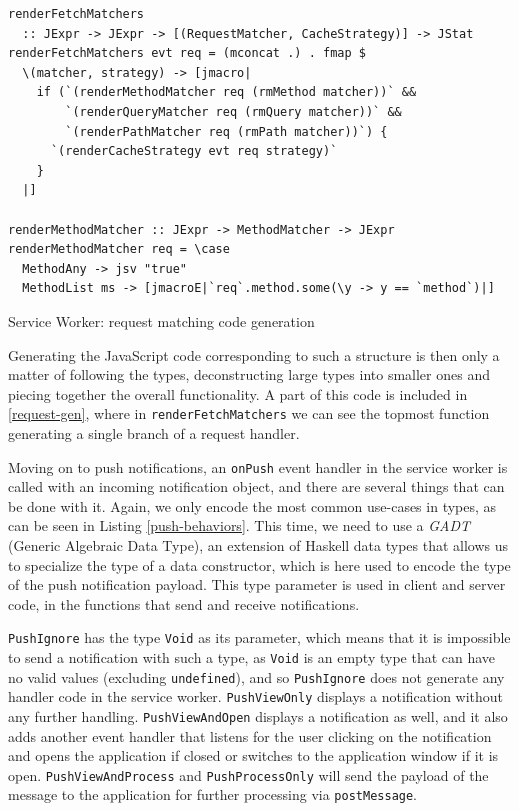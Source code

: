 \documentclass[english,zadani,odsaz]{fitthesis}
\begin{document}
\begin{listing}[tb]
\begin{verbatim}
renderFetchMatchers
  :: JExpr -> JExpr -> [(RequestMatcher, CacheStrategy)] -> JStat
renderFetchMatchers evt req = (mconcat .) . fmap $
  \(matcher, strategy) -> [jmacro|
    if (`(renderMethodMatcher req (rmMethod matcher))` &&
        `(renderQueryMatcher req (rmQuery matcher))` &&
        `(renderPathMatcher req (rmPath matcher))`) {
      `(renderCacheStrategy evt req strategy)`
    }
  |]

renderMethodMatcher :: JExpr -> MethodMatcher -> JExpr
renderMethodMatcher req = \case
  MethodAny -> jsv "true"
  MethodList ms -> [jmacroE|`req`.method.some(\y -> y == `method`)|]
\end{verbatim}
\caption{Service Worker: request matching code generation \label{request-gen}}
\end{listing}

Generating the JavaScript code corresponding to such a structure is then only a
matter of following the types, deconstructing large types into smaller ones and
piecing together the overall functionality. A part of this code is included
in \ref{request-gen}, where in \texttt{renderFetchMatchers} we can see the topmost function
generating a single branch of a request handler.

Moving on to push notifications, an \texttt{onPush} event handler in the service worker
is called with an incoming notification object, and there are several things
that can be done with it. Again, we only encode the most common use-cases in
types, as can be seen in Listing \ref{push-behaviors}. This time, we need to use a
\emph{GADT} (Generic Algebraic Data Type), an extension of Haskell data types that
allows us to specialize the type of a data constructor, which is here used to
encode the type of the push notification payload. This type parameter is used in
client and server code, in the functions that send and receive notifications.

\texttt{PushIgnore} has the type \texttt{Void} as its parameter, which means that it is impossible
to send a notification with such a type, as \texttt{Void} is an empty type that can have
no valid values (excluding \texttt{undefined}), and so \texttt{PushIgnore} does not generate any
handler code in the service worker. \texttt{PushViewOnly} displays a notification without
any further handling. \texttt{PushViewAndOpen} displays a notification as well, and it
also adds another event handler that listens for the user clicking on the
notification and opens the application if closed or switches to the application
window if it is open. \texttt{PushViewAndProcess} and \texttt{PushProcessOnly} will send the
payload of the message to the application  for further processing via
\texttt{postMessage}.
\end{document}
